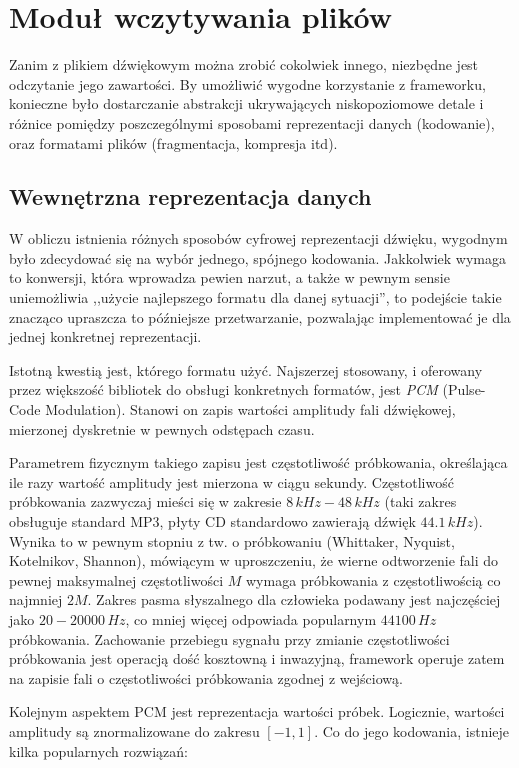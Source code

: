 \chapter{Moduł wczytywania plików}

Zanim z plikiem dźwiękowym można zrobić cokolwiek innego, niezbędne jest odczytanie jego zawartości.
By umożliwić wygodne korzystanie z frameworku, konieczne było dostarczanie abstrakcji ukrywających
niskopoziomowe detale i różnice pomiędzy poszczególnymi sposobami reprezentacji danych (kodowanie),
oraz formatami plików (fragmentacja, kompresja itd). 

\section{Wewnętrzna reprezentacja danych}

W obliczu istnienia różnych sposobów cyfrowej reprezentacji dźwięku, wygodnym było zdecydować się na
wybór jednego, spójnego kodowania. Jakkolwiek wymaga to konwersji, która wprowadza pewien narzut, a
także w pewnym sensie uniemożliwia ,,użycie najlepszego formatu dla danej sytuacji'', to podejście
takie znacząco upraszcza to późniejsze przetwarzanie, pozwalając implementować je dla jednej
konkretnej reprezentacji.

Istotną kwestią jest, którego formatu użyć. Najszerzej stosowany, i oferowany przez większość
bibliotek do obsługi konkretnych formatów, jest \emph{PCM} (Pulse-Code Modulation). Stanowi on zapis
wartości amplitudy fali dźwiękowej, mierzonej dyskretnie w pewnych odstępach czasu. 

Parametrem fizycznym takiego zapisu jest częstotliwość próbkowania, określająca ile razy wartość
amplitudy jest mierzona w ciągu sekundy. Częstotliwość próbkowania zazwyczaj mieści się w zakresie
$8\,kHz - 48\,kHz$ (taki zakres obsługuje standard MP3, płyty CD standardowo zawierają dźwięk
$44.1\,kHz$).  Wynika to w pewnym stopniu z tw. o próbkowaniu (Whittaker, Nyquist, Kotelnikov,
Shannon), mówiącym w uproszczeniu, że wierne odtworzenie fali do pewnej maksymalnej częstotliwości
$M$ wymaga próbkowania z częstotliwością co najmniej $2M$. Zakres pasma słyszalnego dla człowieka
podawany jest najczęściej jako $20-20000\,Hz$, co mniej więcej odpowiada popularnym $44100\,Hz$
próbkowania. Zachowanie przebiegu sygnału przy zmianie częstotliwości próbkowania jest operacją dość
kosztowną i inwazyjną, framework operuje zatem na zapisie fali o częstotliwości próbkowania zgodnej
z wejściową.

Kolejnym aspektem PCM jest reprezentacja wartości próbek. Logicznie, wartości amplitudy są
znormalizowane do zakresu $[-1, 1]$. Co do jego kodowania, istnieje kilka popularnych rozwiązań:


